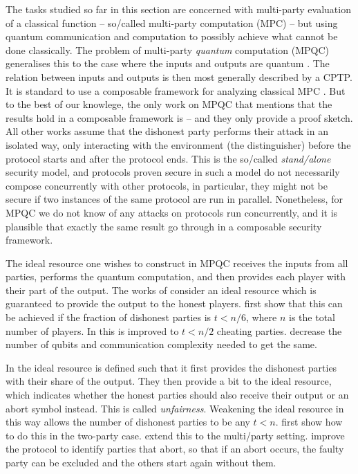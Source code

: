 The tasks studied so far in this section are concerned with
multi-party evaluation of a classical function \--- so\-/called
multi-party computation (MPC) \--- but using quantum communication and
computation to possibly achieve what cannot be done classically. The
problem of multi-party \emph{quantum} computation (MPQC) generalises this to the case where the
inputs and outputs are quantum \cite{CGS02,BCGHS06,DNS12,DGJMS20,LRW20,ACCHLS21}. The relation between inputs and outputs is then most generally described by a CPTP. It is standard to
use a composable framework for analyzing classical MPC
\cite{CDN15}. But to the best of our knowlege, the only work on MPQC
that mentions that the results hold in a composable framework is
\textcite{BCGHS06} \--- and they only provide a proof sketch. All
other works assume that the dishonest party performs their attack in
an isolated way, only interacting with the environment (the
distinguisher) before the protocol starts and after the protocol
ends. This is the so\-/called \emph{stand\-/alone} security model, and
protocols proven secure in such a model do not necessarily compose
concurrently with other protocols, in particular, they might not be
secure if two instances of the same protocol are run in
parallel. Nonetheless, for MPQC we do not know of any
attacks on protocols run concurrently, and it is plausible that
exactly the same result go through in a composable security framework.

The ideal resource one wishes to construct in MPQC receives the inputs
from all parties, performs the quantum computation, and then provides
each player with their part of the output. The works of
\textcite{CGS02,BCGHS06,LRW20} consider an ideal resource which is
guaranteed to provide the output to the honest
players. \textcite{CGS02} first show that this can be achieved if the
fraction of dishonest parties is $t < n/6$, where $n$ is the total
number of players. In \textcite{BCGHS06} this is improved to $t < n/2$
cheating parties. \textcite{LRW20} decrease the number of qubits and
communication complexity needed to get the same.

In \textcite{DNS12,DGJMS20,ACCHLS21} the ideal resource is defined
such that it first provides the dishonest parties with their share of
the output. They then provide a bit to the ideal resource, which
indicates whether the honest parties should also receive their output
or an abort symbol instead. This is called
\emph{unfairness}. Weakening the ideal resource in this way allows the
number of dishonest parties to be any $t < n$. \textcite{DNS12} first
show how to do this in the two-party case. \textcite{DGJMS20} extend
this to the multi\-/party setting.  \textcite{ACCHLS21} improve the
protocol to identify parties that abort, so that if an abort occurs,
the faulty party can be excluded and the others start again without
them.

